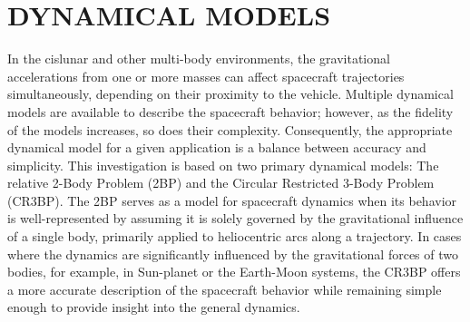 \chapter{DYNAMICAL MODELS}

In the cislunar and other multi-body environments, the gravitational accelerations from one or more
masses can affect spacecraft trajectories simultaneously, depending on their proximity to the
vehicle. Multiple dynamical models are available to describe the spacecraft behavior; however, as
the fidelity of the models increases, so does their complexity. Consequently, the appropriate
dynamical model for a given application is a balance between accuracy and simplicity. This
investigation is based on two primary dynamical models: The relative 2-Body Problem (2BP) and the
Circular Restricted 3-Body Problem (CR3BP). The 2BP serves as a model for spacecraft dynamics when
its behavior is well-represented by assuming it is solely governed by the gravitational influence
of a single body, primarily applied to heliocentric arcs along a trajectory. In cases where the
dynamics are significantly influenced by the gravitational forces of two bodies, for example, in
Sun-planet or the Earth-Moon systems, the CR3BP offers a more accurate description of the
spacecraft behavior while remaining simple enough to provide insight into the general dynamics.







